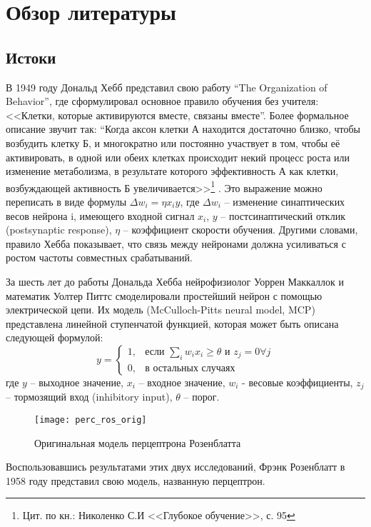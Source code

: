 \clearpage
\section{Обзор литературы}
\subsection{Истоки}
В 1949 году Дональд Хебб представил свою работу “The Organization of Behavior”, где сформулировал основное правило обучения без учителя: <<Клетки, которые активируются вместе, связаны вместе”. Более формальное описание звучит так: “Когда аксон клетки А находится достаточно близко, чтобы возбудить клетку Б, и многократно или постоянно участвует в том, чтобы её активировать, в одной или обеих клетках происходит некий процесс роста или изменение метаболизма, в результате которого эффективность А как клетки, возбуждающей активность Б увеличивается>>\footnote{Цит. по кн.: Николенко С.И <<Глубокое обучение>>, с. 95} . Это выражение можно переписать в виде формулы $\Delta w_i = \eta x_{i} y$, где $\Delta w_i$ – изменение синаптических весов нейрона i, имеющего входной сигнал $x_i$, $y$ – постсинаптический отклик (postsynaptic response),  $\eta$ -- коэффициент скорости обучения. Другими словами, правило Хебба показывает, что связь между нейронами должна усиливаться с ростом частоты совместных срабатываний. 
\par
За шесть лет до работы Дональда Хебба нейрофизиолог Уоррен Маккаллок и математик Уолтер Питтс смоделировали простейший нейрон с помощью электрической цепи. Их модель (McCulloch-Pitts neural model, MCP) представлена линейной ступенчатой функцией, которая может быть описана следующей формулой:
\begin{equation}
	y =
	\begin{cases}
		1,& \text{если } \sum_{i}{w_i x_i} \geq \theta \text{ и } z_j = 0 \forall{j} \\
		0,& \text{в остальных случаях}
	\end{cases}
\end{equation}
где $y$ – выходное значение, $x_i$ – входное значение, $w_i$ - весовые коэффициенты, $z_j$ – тормозящий вход (inhibitory input), $\theta$ -- порог.
\par
\begin{figure}[h]
	\centering
	\texttt{[image: perc\_ros\_orig]}
	\caption{Оригинальная модель перцептрона Розенблатта}
	\label{hist:rosorig}
\end{figure}
Воспользовавшись результатами этих двух исследований, Фрэнк Розенблатт в 1958 году представил свою модель, названную перцептрон.
